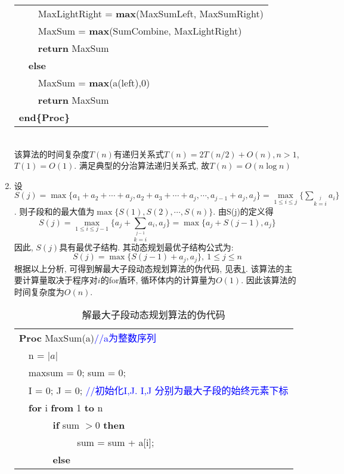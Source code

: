 \begin{solution}
\begin{enumerate}
\begin{table}[!htb]
\begin{tabular}{lllll}
 &  & \multicolumn{3}{l}{MaxLightRight = \textbf{max}(MaxSumLeft, MaxSumRight)} \\
 &  & \multicolumn{3}{l}{MaxSum = \textbf{max}(SumCombine, MaxLightRight)} \\
 &  & \multicolumn{3}{l}{\textbf{return} MaxSum} \\
 & \multicolumn{4}{l}{\textbf{else}} \\
 &  & \multicolumn{3}{l}{MaxSum = \textbf{max}(a(left),0)} \\
 &  & \multicolumn{3}{l}{\textbf{return} MaxSum} \\
\multicolumn{5}{l}{\textbf{end\{Proc\}}} \\
\hline
\end{tabular}
\end{table}\\
该算法的时间复杂度$T(n)$有递归关系式$T(n)=2T(n/2)+O(n), n>1$, $T(1) = O(1)$. 满足典型的分治算法递归关系式, 故$T(n) = O(n\log n)$
\item 设$S(j)=\max\{a_1+a_2+\cdots + a_j, a_2+a_3+\cdots + a_j, \cdots, a_{j-1}+a_j,a_j\} = \max\limits_{1\leq i\leq j}\{\sum\limits_{k=i}\limits^ja_i\}$. 则子段和的最大值为$\max\{S(1), S(2), \cdots, S(n)\}$. 由S(j)的定义得
    \[
    S(j) = \max\limits_{1\leq i\leq j-1}\{a_j+\sum\limits_{k=i}\limits^{j-1}a_i, a_j\} = \max\{a_j+S(j-1), a_j\}
    \]
因此, $S(j)$具有最优子结构. 其动态规划最优子结构公式为:
\[
S(j) = \max\{S(j-1)+a_j, a_j\},{~} 1\leq j\leq n
\]
根据以上分析, 可得到解最大子段动态规划算法的伪代码, 见表\ref{Maxsum}.
该算法的主要计算量取决于程序对$i$的for盾环, 循环体内的计算量为$O(1)$. 因此该算法的时间复杂度为$O(n)$.
\begin{table}[!htb]
\centering
\caption{\label{Maxsum}解最大子段动态规划算法的伪代码}
\begin{tabular}{llll}
\hline
\multicolumn{4}{l}{\textbf{Proc} MaxSum(a)\textcolor{blue}{//a为整数序列}} \\
 & \multicolumn{3}{l}{n = $|a|$} \\
 & \multicolumn{3}{l}{maxsum = 0; sum = 0;} \\
 & \multicolumn{3}{l}{I = 0; J = 0; \textcolor{blue}{//初始化I,J. I,J 分别为最大子段的始终元素下标}} \\
 & \multicolumn{3}{l}{\textbf{for} i \textbf{from} 1 \textbf{to} n} \\
 &  & \multicolumn{2}{l}{\textbf{if} sum $> 0$ \textbf{then}} \\
 &  &  & sum = sum + a[i]; \\
 &  & \multicolumn{2}{l}{\textbf{else}} \\

\end{tabular}
\end{table}
\end{enumerate}
\end{solution}
